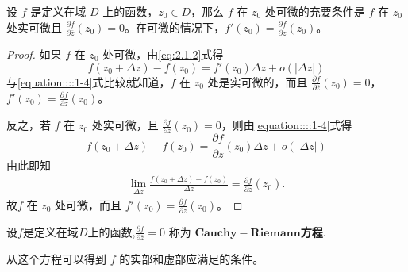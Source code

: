 \documentclass[../../main.tex]{subfiles}
\begin{document}
\begin{theorem}\label{theorem:复变函数可微的充要条件1}
设 \( f \) 是定义在域 \( D \) 上的函数，\( z_0 \in D \)，那么 \( f \) 在 \( z_0 \) 处可微的充要条件是 \( f \) 在 \( z_0 \) 处实可微且 \( \frac{\partial f}{\partial \overline{z}}(z_0) = 0 \)。在可微的情况下，\( f'(z_0) = \frac{\partial f}{\partial z}(z_0) \)。
\end{theorem}
\begin{proof}
如果 \( f \) 在 \( z_0 \) 处可微，由\eqref{eq:2.1.2}式得
\[
f(z_0 + \Delta z) - f(z_0) = f'(z_0)\Delta z + o(|\Delta z|)
\]
与\eqref{equation::::1-4}式比较就知道，\( f \) 在 \( z_0 \) 处是实可微的，而且 \( \frac{\partial f}{\partial \overline{z}}(z_0) = 0 \)，\( f'(z_0) = \frac{\partial f}{\partial z}(z_0) \)。

反之，若 \( f \) 在 \( z_0 \) 处实可微，且 \( \frac{\partial f}{\partial \overline{z}}(z_0) = 0 \)，则由\eqref{equation::::1-4}式得
\[
f(z_0 + \Delta z) - f(z_0) = \frac{\partial f}{\partial z}(z_0)\Delta z + o(|\Delta z|)
\]
由此即知 
\begin{align*}
\underset{\Delta z}{\lim}\frac{f\left( z_0+\Delta z \right) -f\left( z_0 \right)}{\Delta z}=\frac{\partial f}{\partial z}\left( z_0 \right).
\end{align*}
故\( f \) 在 \( z_0 \) 处可微，而且 \( f'(z_0) = \frac{\partial f}{\partial z}(z_0) \)。 
\end{proof}

\begin{definition}
设$f$是定义在域$D$上的函数,$\frac{\partial f}{\partial \overline{z}} = 0$ 称为 $\mathbf{Cauchy}-\mathbf{Riemann}$\textbf{方程}.
\end{definition}
\begin{note}
从这个方程可以得到 $f$ 的实部和虚部应满足的条件。
\end{note}
\end{document}
